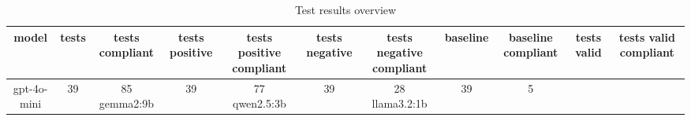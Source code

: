 
  \begin{table}[h!]
  \centering
  \begin{tabular}{|c|c|c|c|c|c|c|c|c|c|c|}
  \hline
  model & tests & tests compliant & tests positive & tests positive compliant & tests negative & tests negative compliant & baseline & baseline compliant & tests valid & tests valid compliant \\
  \hline
  gpt-4o-mini & 39 & 85%
\hline
gemma2:9b & 39 & 77%
\hline
qwen2.5:3b & 39 & 28%
\hline
llama3.2:1b & 39 & 5%
  \end{tabular}
  \caption{Test results overview}
  
  \end{table}
  